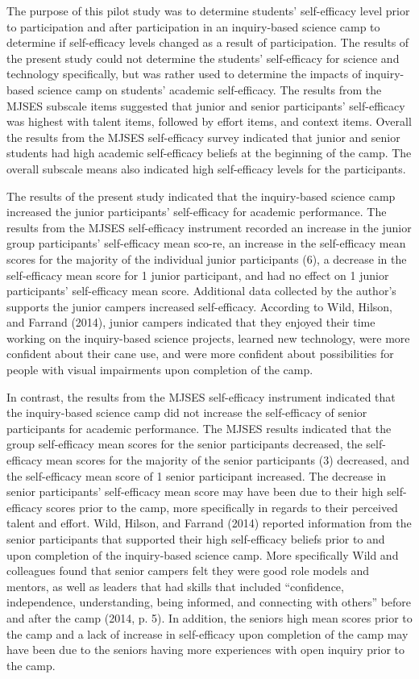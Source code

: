 \documentclass[11.5pt]{sig-alternate} %
\begin{document}
\begin{large}
The purpose of this pilot study was to determine students’ self-efficacy level prior to participation and after participation in an inquiry-based science camp to determine if self-efficacy levels changed as a result of participation. The results of the present study could not determine the students’ self-efficacy for science and technology specifically, but was rather used to determine the impacts of inquiry-based science camp on students’ academic self-efficacy. The results from the MJSES subscale items suggested that junior and senior participants’ self-efficacy was highest with talent items, followed by effort items, and context items. Overall the results from the MJSES self-efficacy survey indicated that junior and senior students had high academic self-efficacy beliefs at the beginning of the camp. The overall subscale means also indicated high self-efficacy levels for the participants.  
	
The results of the present study indicated that the inquiry-based science camp increased the junior participants’ self-efficacy for academic performance. The results from the MJSES self-efficacy instrument recorded an increase in the junior group participants’ self-efficacy mean sco-re, an increase in the self-efficacy mean scores for the majority of the individual junior participants (6), a decrease in the self-efficacy mean score for 1 junior participant, and had no effect on 1 junior participants’ self-efficacy mean score. Additional data collected by the author’s supports the junior campers increased self-efficacy. According to Wild, Hilson, and Farrand (2014), junior campers indicated that they enjoyed their time working on the inquiry-based science projects, learned new technology, were more confident about their cane use, and were more confident about possibilities for people with visual impairments upon completion of the camp.
	
In contrast, the results from the MJSES self-efficacy instrument indicated that the inquiry-based science camp did not increase the self-efficacy of senior participants for academic performance. The MJSES results indicated that the group self-efficacy mean scores for the senior participants decreased, the self-efficacy mean scores for the majority of the senior participants (3) decreased, and the self-efficacy mean score of 1 senior participant increased.  The decrease in senior participants’ self-efficacy mean score may have been due to their high self-efficacy scores prior to the camp, more specifically in regards to their perceived talent and effort. Wild, Hilson, and Farrand (2014) reported information from the senior participants that supported their high self-efficacy beliefs prior to and upon completion of the inquiry-based science camp.  More specifically Wild and colleagues found that senior campers felt they were good role models and mentors, as well as leaders that had skills that included “confidence, independence, understanding, being informed, and connecting with others” before and after the camp (2014, p. 5). In addition, the seniors high mean scores prior to the camp and a lack of increase in self-efficacy upon completion of the camp may have been due to the seniors having more experiences with open inquiry prior to the camp.  


\end{large}
\end{document}
